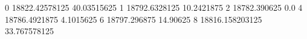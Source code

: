 0 18822.42578125 40.03515625
1 18792.6328125 10.2421875
2 18782.390625 0.0
4 18786.4921875 4.1015625
6 18797.296875 14.90625
8 18816.158203125 33.767578125
